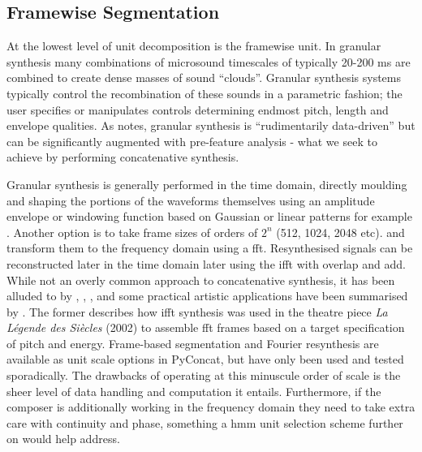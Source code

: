 \subsection{Framewise Segmentation}

At the lowest level of unit decomposition is the framewise unit. In granular synthesis many combinations of microsound timescales of typically 20-200 ms are combined to create dense masses of sound “clouds”. Granular synthesis systems typically control the recombination of these sounds in a parametric fashion; the user specifies or manipulates controls determining endmost pitch, length and envelope qualities. As \cite{Schwarz2003} notes, granular synthesis is “rudimentarily data-driven” but can be significantly augmented with pre-feature analysis - what we seek to achieve by performing concatenative synthesis. 

Granular synthesis is generally performed in the time domain, directly moulding and shaping the portions of the waveforms themselves using an amplitude envelope or windowing function based on Gaussian or linear patterns for example \citep{Roads1996, Roads2004}. Another option is to take frame sizes of orders of $2^n$ (512, 1024, 2048 etc). and transform them to the frequency domain using a \acrfull{fft}. Resynthesised signals can be reconstructed later in the time domain later using the \acrfull{ifft} with overlap and add. While not an overly common approach to concatenative synthesis, it has been alluded to by \cite{Kobayashi}, \cite{Puckette2004}, \cite{An2012}, and some practical artistic applications have been summarised by \cite{Schwarz2006b}. The former describes how \acrshort{ifft} synthesis was used in the theatre piece \textit{La Légende des Siècles} (2002) to assemble \acrshort{fft} frames based on a target specification of pitch and energy. Frame-based segmentation and Fourier resynthesis are available as unit scale options in PyConcat, but have only been used and tested sporadically. The drawbacks of operating at this minuscule order of scale is the sheer level of data handling and computation it entails. Furthermore, if the composer is additionally working in the frequency domain they need to take extra care with continuity and phase, something a \acrshort{hmm} unit selection scheme further on would help address. 


